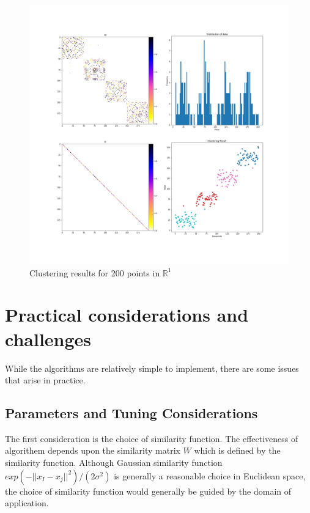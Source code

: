 \documentclass[10pt,a4paper, nocenter]{report}
\newcommand{\norm}[1]{\lvert\lvert {#1} \rvert\rvert}
\begin{document}
\begin{enumerate}
        \begin{figure}
        \includegraphics[width=\textwidth]{../../1DCluster.jpg}
        \caption{Clustering results for 200 points in $\mathbb{R}^1$}
        \label{fig:2dresults}
        \end{figure}
    \end{enumerate}
    
    
    \section{Practical considerations and challenges}

    While the algorithms are relatively simple to implement, there are some issues that arise in practice. 
    
    \subsection{Parameters and Tuning Considerations}
    The first consideration is the choice of similarity function. The effectiveness of algorithem depends upon the similarity matrix $W$ which is defined by the similarity function. Although Gaussian similarity function $exp(-\norm{x_I - x_j}^2)/(2\sigma^2)$ is generally a reasonable choice in Euclidean space, the choice of similarity function would generally be guided by the domain of application. 
\end{document}
